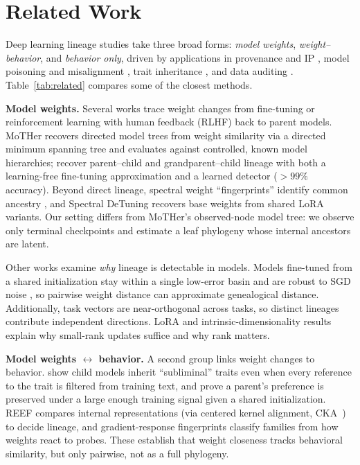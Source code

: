 \section{Related Work}
\label{sec:related}

Deep learning lineage studies take three broad forms: \emph{model weights}, \emph{weight--behavior},
and \emph{behavior only}, driven by applications in provenance and IP
\citep{horwitz2025mother, zeng2024huref, nikolic2026model}, model poisoning and misalignment
\citep{cloud2025subliminal}, trait inheritance \citep{cloud2025subliminal, agents2026same}, and data
auditing \citep{zhu2025independence}. Table~\ref{tab:related} compares some of the closest methods.

\textbf{Model weights.} Several works trace weight changes from fine-tuning or reinforcement learning with human feedback (RLHF) back to parent models. MoTHer
\citep{horwitz2025mother} recovers directed model trees from weight similarity via a directed minimum
spanning tree and evaluates against controlled, known model hierarchies; \citet{yu2025neural} recover parent--child and grandparent--child lineage with both a
learning-free fine-tuning approximation and a learned detector ($>99\%$ accuracy). Beyond direct
lineage, spectral weight ``fingerprints'' identify common ancestry \citep{ghostspec2025}, and Spectral
DeTuning \citep{horwitz2024spectral} recovers base weights from shared LoRA variants. Our setting
differs from MoTHer's observed-node model tree: we observe only terminal checkpoints and estimate a
leaf phylogeny whose internal ancestors are latent.

Other works examine \emph{why} lineage is detectable in models. Models fine-tuned from a shared initialization stay
within a single low-error basin and are robust to SGD noise
\citep{neyshabur2020,wortsman2022model,frankle2020linear}, so pairwise weight distance can approximate genealogical distance. Additionally, task vectors \citep{ilharco2023editing} are near-orthogonal across tasks, so
distinct lineages contribute independent directions. LoRA \citep{hu2022lora} and intrinsic-dimensionality
results \citep{aghajanyan2021intrinsic} explain why small-rank updates suffice and why rank matters.

\textbf{Model weights $\leftrightarrow$ behavior.} A second group links weight changes to
behavior. \citet{cloud2025subliminal} show child models inherit ``subliminal'' traits even when every
reference to the trait is filtered from training text, and prove a parent's preference is preserved
under a large enough training signal given a shared initialization. REEF \citep{zhang2025reef} compares
internal representations (via centered kernel alignment, CKA~\citep{kornblith2019similarity}) to decide lineage, and gradient-response fingerprints
\citep{tensorguard2025} classify families from how weights react to probes. These establish that
weight closeness tracks behavioral similarity, but only pairwise, not as a full phylogeny.

